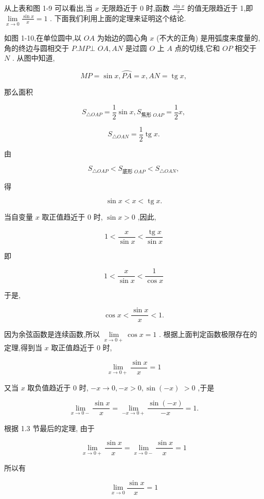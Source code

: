 \documentclass[lang=cn,newtx,10pt,scheme=chinese]{elegantbook}
\begin{document}
从上表和图 1-9 可以看出,当 \(x\) 无限趋近于 0 时,函数 \(\frac{\sin x}{x}\) 的值无限趋近于 1,即 \(\mathop{\lim }\limits_{{x \rightarrow 0}}\frac{\sin x}{x} = 1\) . 下面我们利用上面的定理来证明这个结论.

如图 1-10,在单位圆中,以 \({OA}\) 为始边的圆心角 \(x\) (不大的正角) 是用弧度来度量的,角的终边与圆相交于 \(P.{MP} \bot\) \({OA},{AN}\) 是过圆 \(O\) 上 \(A\) 点的切线,它和 \({OP}\) 相交于 \(N\) . 从图中知道,

\[
{MP} = \sin x,\overset{⏜}{PA} = x,{AN} = \operatorname{tg}x,
\]

那么面积

\[
{S}_{\bigtriangleup {OAP}} = \frac{1}{2}\sin x,{S}_{\text{焦形 }{OAP}} = \frac{1}{2}x,
\]

\[
{S}_{\bigtriangleup {OAN}} = \frac{1}{2}\operatorname{tg}x.
\]

由

\[
{S}_{\bigtriangleup {OAP}} < {S}_{\text{底形 }{OAP}} < {S}_{\bigtriangleup {OAN}},
\]

得

\[
\sin x < x < \operatorname{tg}x\text{.}
\]

当自变量 \(x\) 取正值趋近于 0 时, \(\sin x > 0\) ,因此,

\[
1 < \frac{x}{\sin x} < \frac{\operatorname{tg}x}{\sin x}
\]

即

\[
1 < \frac{x}{\sin x} < \frac{1}{\cos x}
\]

于是,

\[
\cos x < \frac{\sin x}{x} < 1\text{.}
\]

因为余弦函数是连续函数,所以 \(\mathop{\lim }\limits_{{x \rightarrow 0 + }}\cos x = 1\) . 根据上面判定函数极限存在的定理,得到当 \(x\) 取正值趋近于 0 时,

\[
\mathop{\lim }\limits_{{x \rightarrow 0 + }}\frac{\sin x}{x} = 1
\]

又当 \(x\) 取负值趋近于 0 时, \(- x \rightarrow 0, - x > 0,\sin \left( {-x}\right)\) \(> 0\) ,于是

\[
\mathop{\lim }\limits_{{x \rightarrow 0 - }}\frac{\sin x}{x} = \mathop{\lim }\limits_{{-x \rightarrow 0 + }}\frac{\sin \left( {-x}\right) }{-x} = 1.
\]

根据 1.3 节最后的定理, 由于

\[
\mathop{\lim }\limits_{{x \rightarrow 0 + }}\frac{\sin x}{x} = \mathop{\lim }\limits_{{x \rightarrow 0 - }}\frac{\sin x}{x} = 1
\]

所以有

\[
\mathop{\lim }\limits_{{x \rightarrow 0}}\frac{\sin x}{x} = 1
\]
\end{document}
